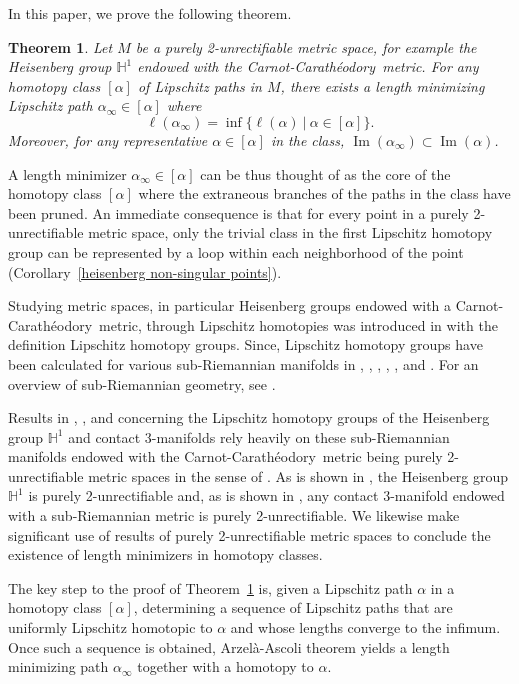 \documentclass{article}
\newtheorem{theorem}{Theorem}[section]
\theoremstyle{definition}
\theoremstyle{remark}
\def\H{\mathbb{H}}
\DeclareMathOperator{\Ima}{Im}
\def\cc{Carnot-Carath\'{e}odory~}
\def\H{\mathbb{H}}
\newcommand{\length}[1]{\ell}%
\newcommand{\core}[1]{{#1}_\infty}
\begin{document}
In this paper, we prove the following theorem.

\begin{theorem}\label{main result}
Let $M$ be a purely 2-unrectifiable metric space, for example the Heisenberg group $\H^1$ endowed with the \cc metric. For any homotopy class $[\alpha]$ of Lipschitz paths in $M$, there exists a length minimizing Lipschitz path $\core{\alpha}\in[\alpha]$ where
\[
\length{M}(\core{\alpha})=\inf\{\length{M}(\alpha)~|~\alpha\in[\alpha]\}.
\]
Moreover, for any representative $\alpha\in[\alpha]$ in the class, $\Ima(\core{\alpha})\subset\Ima(\alpha)$.
\end{theorem}
A length minimizer $\core{\alpha}\in[\alpha]$ can be thus thought of as the core of the homotopy class $[\alpha]$ where the extraneous branches of the paths in the class have been pruned. An immediate consequence is that for every point in a purely 2-unrectifiable metric space, only the trivial class in the first Lipschitz homotopy group can be represented by a loop within each neighborhood of the point (Corollary~\ref{heisenberg non-singular points}). 

Studying metric spaces, in particular Heisenberg groups endowed with a \cc metric, through Lipschitz homotopies was introduced in \cite{Dej} with the definition Lipschitz homotopy groups. Since, Lipschitz homotopy groups have been calculated for various sub-Riemannian manifolds in \cite{Dej}, \cite{Haj}, \cite{HajSch}, \cite{HajTys}, \cite{perry2020lipschitz}, and \cite{Weg}. For an overview of sub-Riemannian geometry, see \cite{Mon}.

Results in \cite{Dej}, \cite{perry2020lipschitz}, and \cite{Weg} concerning the Lipschitz homotopy groups of the Heisenberg group $\H^1$ and contact 3-manifolds rely heavily on these sub-Riemannian manifolds endowed with the \cc metric being purely 2-unrectifiable metric spaces in the sense of \cite{Amb}. As is shown in \cite{Amb}, the Heisenberg group $\H^1$ is purely 2-unrectifiable and, as is shown in \cite{perry2020lipschitz}, any contact 3-manifold endowed with a sub-Riemannian metric is purely 2-unrectifiable. We likewise make significant use of results of purely 2-unrectifiable metric spaces to conclude the existence of length minimizers in homotopy classes.

The key step to the proof of Theorem~\ref{main result} is, given a Lipschitz path $\alpha$ in a homotopy class $[\alpha]$, determining a sequence of Lipschitz paths that are uniformly Lipschitz homotopic to $\alpha$ and whose lengths converge to the infimum. Once such a sequence is obtained, Arzel\`{a}-Ascoli theorem yields a length minimizing path $\core{\alpha}$ together with a homotopy to $\alpha$. 
\end{document}
